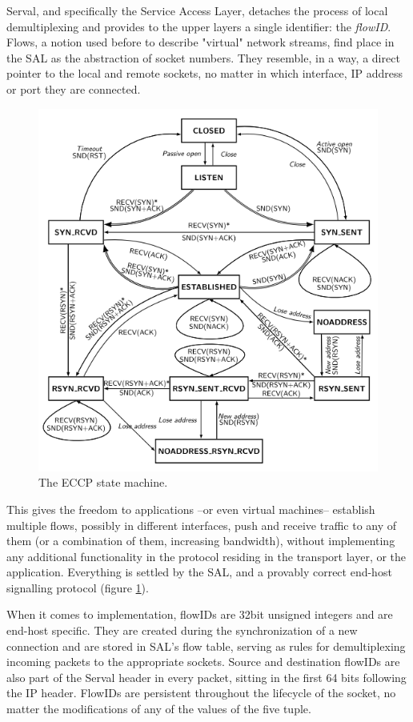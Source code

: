 Serval, and specifically the Service Access Layer, detaches the process of local demultiplexing and provides to the upper layers a single identifier: the \emph{flowID}.
Flows, a notion used before to describe "virtual" network streams, find place in the SAL as the abstraction of socket numbers.
They resemble, in a way, a direct pointer to the local and remote sockets, no matter in which interface, IP address or port they are connected.

\begin{figure}
\centering
{}
\includegraphics[scale=0.6]{figures/ECCP_sm}
\caption[The ECCP state machine]{The ECCP \cite{Arye2012} state machine.}
\label{fig:EECP_sm}
\end{figure}

This gives the freedom to applications --or even virtual machines-- establish multiple flows, possibly in different interfaces, push and receive traffic to any of them (or a combination of them, increasing bandwidth), without implementing any additional functionality in the protocol residing in the transport layer, or the application.
Everything is settled by the SAL, and a provably correct end-host signalling protocol (figure \ref{fig:EECP_sm}).

When it comes to implementation, flowIDs are 32bit unsigned integers and are end-host specific.
They are created during the synchronization of a new connection and are stored in SAL's flow table, serving as rules for demultiplexing incoming packets to the appropriate sockets.
Source and destination flowIDs are also part of the Serval header in every packet, sitting in the first 64 bits following the IP header.
FlowIDs are persistent throughout the lifecycle of the socket, no matter the modifications of any of the values of the five tuple.
